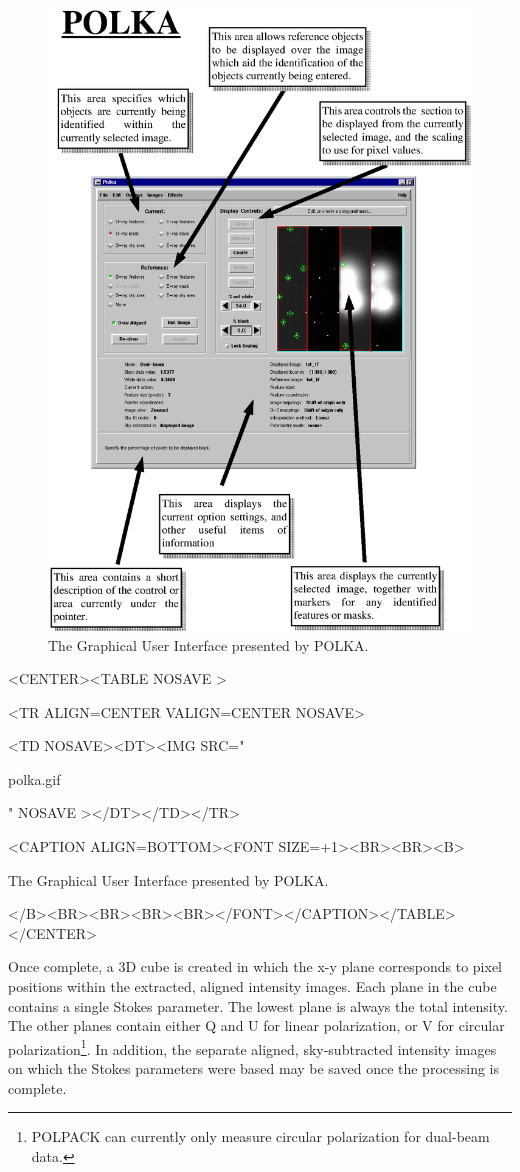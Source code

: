 \documentclass[twoside,11pt]{article}
\newenvironment{latexonly}{}{}
\renewcommand{\_}{\texttt{\symbol{95}}}
\newcommand{\htmlfig}[3]{
   \label{#1}
   \begin{rawhtml} <CENTER><TABLE NOSAVE > \end{rawhtml}
   \begin{rawhtml} <TR ALIGN=CENTER VALIGN=CENTER NOSAVE> \end{rawhtml}
   \begin{rawhtml} <TD NOSAVE><DT><IMG SRC=" \end{rawhtml}
   #2
   \begin{rawhtml} " NOSAVE ></DT></TD></TR> \end{rawhtml}
   \begin{rawhtml} <CAPTION ALIGN=BOTTOM><FONT SIZE=+1><BR><BR><B> \end{rawhtml}
   #3 
   \begin{rawhtml} </B><BR><BR><BR><BR></FONT></CAPTION></TABLE></CENTER> \end{rawhtml}
}
\begin{document}
\begin{latexonly}
  \begin{figure}[htpb]
  \begin{center}
  \includegraphics[clip,scale=0.85]{sun223_figures/polka.eps}
  \vspace{4mm}
  \caption{The Graphical User Interface presented by POLKA.}
  \label{fig:polka}
  \end{center}
  \end{figure}
\end{latexonly}

\begin{htmlonly}
\htmlfig{fig:polka}{polka.gif}{
The Graphical User Interface presented by POLKA.}
\end{htmlonly}

Once complete, a 3D cube is created in which the x-y plane corresponds to
pixel positions within the extracted, aligned intensity images. Each
plane in the cube contains a single Stokes parameter. The lowest plane is
always the total intensity. The other planes contain either Q and U for
linear polarization, or V for circular polarization\footnote{POLPACK can
currently only measure circular polarization for dual-beam data.}. In
addition, the separate aligned, sky-subtracted intensity images on which
the Stokes parameters were based may be saved once the processing is
complete.
\end{document}
